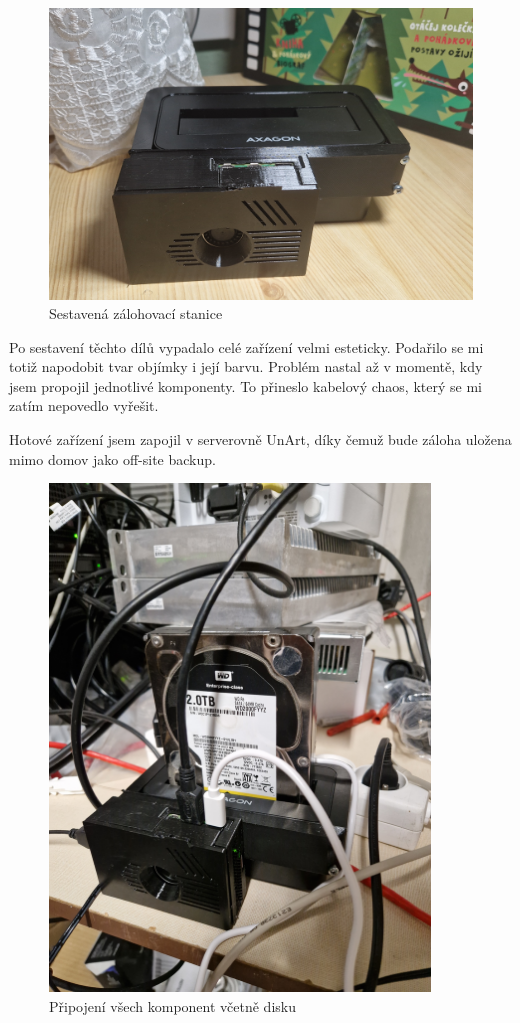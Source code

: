 \documentclass[a4paper,12pt, oneside]{book}
\begin{document}
\begin{figure}[h]
	\centering
	\includegraphics[width=1\textwidth]{img/skladani4-c.jpg}
	\caption{Sestavená zálohovací stanice}
	\end{figure}


Po sestavení těchto dílů vypadalo celé zařízení velmi esteticky. 
Podařilo se mi totiž napodobit tvar objímky i její barvu.
Problém nastal až v momentě, kdy jsem propojil jednotlivé komponenty. 
To přineslo kabelový chaos, který se mi zatím nepovedlo vyřešit.

Hotové zařízení jsem zapojil v serverovně UnArt, díky čemuž bude 
záloha uložena mimo domov jako off-site backup.



\begin{figure}[h]
\centering
\includegraphics[width=0.9\textwidth]{img/zapojeni4.jpg}
\caption{Připojení všech komponent včetně disku}
\end{figure}
\end{document}
